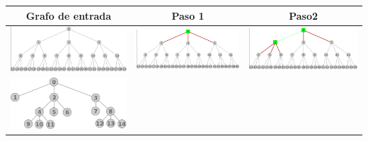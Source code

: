	\begin{center}
		\begin{tabular}{ |c||c||c| }
			\hline
			Grafo de entrada & Paso 1 & Paso2 \\
			\hline\hline
			\includegraphics[scale = 0.15]{img/ej3/constructiva_golosa/ctree_st0.png} &
			\includegraphics[scale = 0.15]{img/ej3/constructiva_golosa/ctree_st1.png} &
			\includegraphics[scale = 0.15]{img/ej3/constructiva_golosa/ctree_st2.png} \\
			\hline
			\includegraphics[scale = 0.3]{img/ej3/constructiva_golosa/tree_st0.png} &

\end{tabular}
\end{center}
